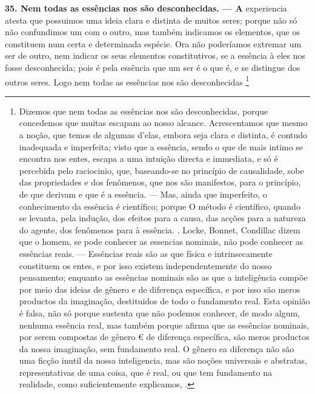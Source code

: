 \documentclass[12pt,a4paper]{article}
\newcommand{\pagmark}[1]{\quad[\textit{p.\,#1}]\quad}
\begin{document}
{{{{{\medskip\noindent\textbf{35. Nem todas as essências nos são desconhecidas. — A}
experiencia atesta que possuimos uma ideia clara e distinta
de muitos seres; porque não só não confundimos um com o
outro, mas também indicamos os elementos, que os constituem
num certa e determinada espécie. Ora não poderíamos extremar
um ser de outro, nem indicar os seus elementos constitutivos,
se a essência à eles nos fosse desconhecida; pois é pela essência
que um ser é o que é, e se distingue dos outros seres. Logo
nem todas as essências nos são desconhecidas \footnote{Dizemos que nem todas as essências nos são desconhecidas, porque
concedemos que muitas escapam ao nosso alcance. Acrescentamos que
mesmo a noção, que temos de algumas d'elas, embora seja clara e distinta,
é contudo inadequada e imperfeita; visto que a essência, sendo o que de
mais intimo se encontra nos entes, escapa a uma intuição directa e immediata, e só é percebida pelo raciocinio, que, baseando-se no princípio de
causalidade, sobe das propriedades e dos fenômenos, que nos são manifestos, para o princípio, de que derivam e que é a essência. — Mas, ainda que
imperfeito, o conhecimento da essência é científico; porque O método é
científico, quando se levanta, pela indução, dos efeitos para a causa, das
acções para a natureza do agente, dos fenômenos para à essência.
 . Locke, Bonnet, Condillac dizem que o homem, se pode conhecer as essencias nominais, não pode conhecer as essências reais. — Essências reais são
as que física e intrinsecamente constituem os entes, e por isso existem
independentemente do nosso pensamento; enquanto as essências nominais
são as que a inteligência compõe por meio das ideias de gênero e de diferença específica, e por isso são meros productos da imaginação, destituidos
de todo o fundamento real.
 Esta opinião é falsa, não só porque sustenta que não podemos conhecer,
de modo algum, nenhuma essência real, mas também porque afirma que as
essências nominais, por serem compostas de gênero € de diferença específica,
são meros productos da nossa imaginação, sem fundamento real. O gênero
ea diferença não são uma ficção inutil da nossa inteligencia, mas são
noções universais e abstratas, representativas de uma coisa, que é real,
ou que tem fundamento na realidade, como suficientemente explicamos,
\pagmark{308}. 
\pagmark{307}

}}}}}}
\end{document}
